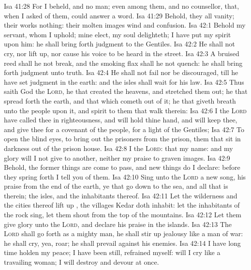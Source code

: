 \vs Isa 41:28 For I beheld, and  no man; even among them, and  no counsellor, that, when I asked of them, could answer a word.
\vs Isa 41:29 Behold, they  all vanity; their works  nothing: their molten images  wind and confusion.
\vs Isa 42:1 Behold my servant, whom I uphold; mine elect,  my soul delighteth; I have put my spirit upon him: he shall bring forth judgment to the Gentiles.
\vs Isa 42:2 He shall not cry, nor lift up, nor cause his voice to be heard in the street.
\vs Isa 42:3 A bruised reed shall he not break, and the smoking flax shall he not quench: he shall bring forth judgment unto truth.
\vs Isa 42:4 He shall not fail nor be discouraged, till he have set judgment in the earth: and the isles shall wait for his law.
\vs Isa 42:5 Thus saith God the \textsc{Lord}, he that created the heavens, and stretched them out; he that spread forth the earth, and that which cometh out of it; he that giveth breath unto the people upon it, and spirit to them that walk therein:
\vs Isa 42:6 I the \textsc{Lord} have called thee in righteousness, and will hold thine hand, and will keep thee, and give thee for a covenant of the people, for a light of the Gentiles;
\vs Isa 42:7 To open the blind eyes, to bring out the prisoners from the prison,  them that sit in darkness out of the prison house.
\vs Isa 42:8 I  the \textsc{Lord}: that  my name: and my glory will I not give to another, neither my praise to graven images.
\vs Isa 42:9 Behold, the former things are come to pass, and new things do I declare: before they spring forth I tell you of them.
\vs Isa 42:10 Sing unto the \textsc{Lord} a new song,  his praise from the end of the earth, ye that go down to the sea, and all that is therein; the isles, and the inhabitants thereof.
\vs Isa 42:11 Let the wilderness and the cities thereof lift up , the villages  Kedar doth inhabit: let the inhabitants of the rock sing, let them shout from the top of the mountains.
\vs Isa 42:12 Let them give glory unto the \textsc{Lord}, and declare his praise in the islands.
\vs Isa 42:13 The \textsc{Lord} shall go forth as a mighty man, he shall stir up jealousy like a man of war: he shall cry, yea, roar; he shall prevail against his enemies.
\vs Isa 42:14 I have long time holden my peace; I have been still,  refrained myself:  will I cry like a travailing woman; I will destroy and devour at once.
